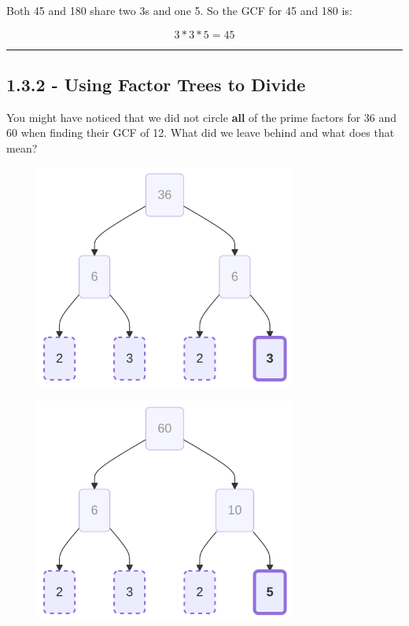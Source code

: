 \documentclass[
  letterpaper,
  DIV=11,
  numbers=noendperiod]{scrreprt}
\begin{document}
Both 45 and 180 share two 3s and one 5. So the GCF for 45 and 180 is:

\[3 * 3 * 5 = 45\]

\begin{center}\rule{0.5\linewidth}{0.5pt}\end{center}

\subsection*{1.3.2 - Using Factor Trees to
Divide}\label{using-factor-trees-to-divide}

You might have noticed that we did not circle \textbf{all} of the prime
factors for 36 and 60 when finding their GCF of 12. What did we leave
behind and what does that mean?

\begin{figure}

\begin{minipage}{0.50\linewidth}

\label{mermaid-diagram}
\includegraphics[width=3.35in,height=2.9in]{chapters/Unit_1/1.3_GCF_&_Simplifying_Fractions_files/figure-latex/mermaid-figure-16.png}

\end{minipage}%
%
\begin{minipage}{0.50\linewidth}

\label{mermaid-diagram}
\includegraphics[width=3.35in,height=2.9in]{chapters/Unit_1/1.3_GCF_&_Simplifying_Fractions_files/figure-latex/mermaid-figure-15.png}

\end{minipage}%

\end{figure}%
\end{document}
